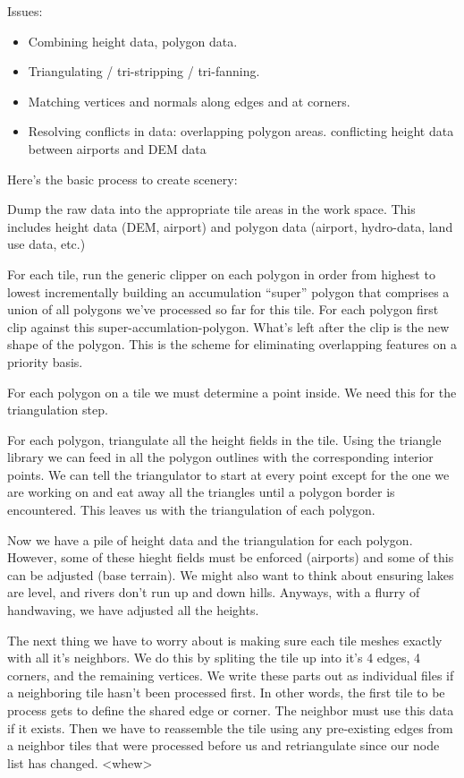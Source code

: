 \documentclass[12pt]{article}
\begin{document}
Issues:

\begin{itemize}
\item Combining height data, polygon data.

\item Triangulating / tri-stripping / tri-fanning.

\item Matching vertices and normals along edges and at corners.

\item Resolving conflicts in data:
  overlapping polygon areas.
  conflicting height data between airports and DEM data
\end{itemize}

Here's the basic process to create scenery:

Dump the raw data into the appropriate tile areas in the work space.
This includes height data (DEM, airport) and polygon data (airport,
hydro-data, land use data, etc.)

For each tile, run the generic clipper on each polygon in order from
highest to lowest incrementally building an accumulation ``super''
polygon that comprises a union of all polygons we've processed so far
for this tile.  For each polygon first clip against this
super-accumlation-polygon.  What's left after the clip is the new
shape of the polygon.  This is the scheme for eliminating overlapping
features on a priority basis.

For each polygon on a tile we must determine a point inside.  We need
this for the triangulation step.

For each polygon, triangulate all the height fields in the tile.
Using the triangle library we can feed in all the polygon outlines
with the corresponding interior points.  We can tell the triangulator
to start at every point except for the one we are working on and eat
away all the triangles until a polygon border is encountered.  This
leaves us with the triangulation of each polygon.

Now we have a pile of height data and the triangulation for each
polygon.  However, some of these hieght fields must be enforced
(airports) and some of this can be adjusted (base terrain).  We might
also want to think about ensuring lakes are level, and rivers don't
run up and down hills.  Anyways, with a flurry of handwaving, we have
adjusted all the heights.

The next thing we have to worry about is making sure each tile meshes
exactly with all it's neighbors.  We do this by spliting the tile up
into it's 4 edges, 4 corners, and the remaining vertices.  We write
these parts out as individual files if a neighboring tile hasn't been
processed first.  In other words, the first tile to be process gets to
define the shared edge or corner.  The neighbor must use this data if
it exists.  Then we have to reassemble the tile using any pre-existing
edges from a neighbor tiles that were processed before us and
retriangulate since our node list has changed. <whew>
\end{document}
